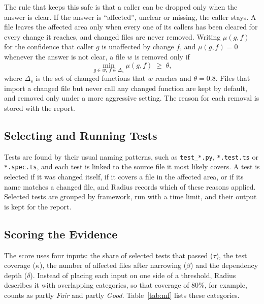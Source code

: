 \documentclass[conference]{IEEEtran}
\begin{document}
The rule that keeps this safe is that a caller can be dropped only when the answer is clear. If the answer is ``affected'', unclear or missing, the caller stays. A file leaves the affected area only when every one of its callers has been cleared for every change it reaches, and changed files are never removed. Writing $\mu(g,f)$ for the confidence that caller $g$ is unaffected by change $f$, and $\mu(g,f) = 0$ whenever the answer is not clear, a file $w$ is removed only if
\begin{equation}
    \min_{g \in w,\ f \in \Delta_s} \mu(g,f) \;\ge\; \theta ,
\end{equation}
where $\Delta_s$ is the set of changed functions that $w$ reaches and $\theta = 0.8$. Files that import a changed file but never call any changed function are kept by default, and removed only under a more aggressive setting. The reason for each removal is stored with the report.

\subsection{Selecting and Running Tests}
Tests are found by their usual naming patterns, such as \texttt{test\_*.py}, \texttt{*.test.ts} or \texttt{*.spec.ts}, and each test is linked to the source file it most likely covers. A test is selected if it was changed itself, if it covers a file in the affected area, or if its name matches a changed file, and Radius records which of these reasons applied. Selected tests are grouped by framework, run with a time limit, and their output is kept for the report.

\subsection{Scoring the Evidence}
The score uses four inputs: the share of selected tests that passed ($\tau$), the test coverage ($\kappa$), the number of affected files after narrowing ($\beta$) and the dependency depth ($\delta$). Instead of placing each input on one side of a threshold, Radius describes it with overlapping categories, so that coverage of 80\%, for example, counts as partly \emph{Fair} and partly \emph{Good}. Table~\ref{tab:mf} lists these categories.
\end{document}
